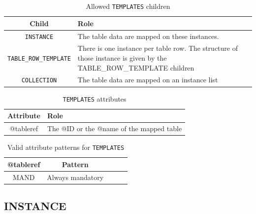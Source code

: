 \documentclass[11pt,a4paper]{ivoa}
\begin{document}
\begin{table}[hbtp]
\small
\centering
\begin{tabulary}{\linewidth}{|c|J|}       
       \hline 
           \textbf{Child} &  
           \textbf{Role}\\
       \hline         \hline  
           \texttt{INSTANCE}    & 
           The table data are mapped on these instances.  \\              
       \hline  
            \texttt{TABLE\_ROW\_TEMPLATE}    &  
            There is one instance per table row. 
             \newline The structure of those instance is given by the TABLE\_ROW\_TEMPLATE children \\              
       \hline  
             \texttt{COLLECTION}    &  
             The table data are mapped on an instance list \\       
       \hline 
     \end{tabulary}
     \caption{Allowed  \texttt{TEMPLATES} children} 
     \label{tbl:templ-children}
 \end{table}


\begin{table}[hbtp]
\small
\centering
\begin{tabulary}{\linewidth}{|c|J|}       
       \hline 
            \textbf{Attribute} & 
            \textbf {Role}\\
       \hline         \hline  
            @tableref  & 
            The @ID or the @name of the mapped table  \\
       \hline 
     \end{tabulary}
     \caption{\texttt{TEMPLATES} attributes} 
     \label{tbl:templ-att}
 \end{table}

\begin{table}[hbtp]
\small
\centering
\begin{tabulary}{\linewidth}{|c|c|c|c|J|}
    \hline 
        \textbf{@tableref} &
        \textbf{Pattern}\\
    \hline      \hline  
        MAND &   
        Always mandatory\\
   \hline 
\end{tabulary}
     \caption{Valid attribute patterns for  \texttt{TEMPLATES}} 
     \label{tbl:templ-pattern}
 \end{table}

%
%
\subsection{INSTANCE}
\end{document}
